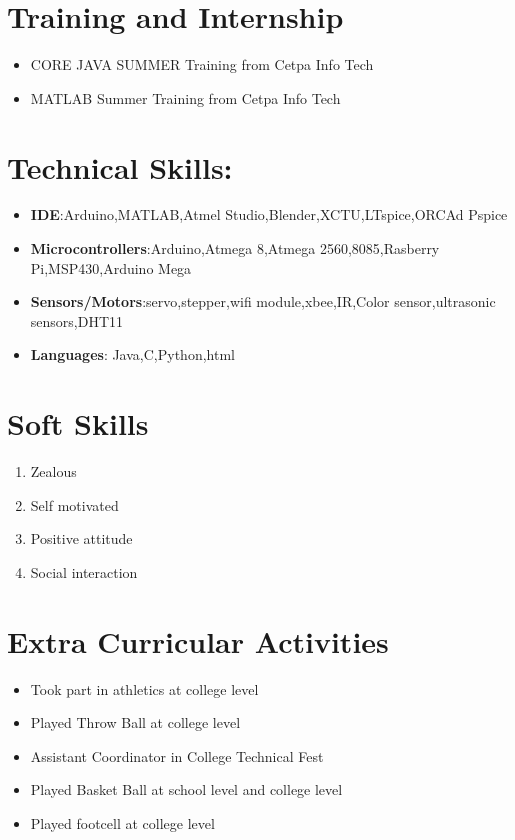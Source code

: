 \documentclass[11pt]{article}
\begin{document}
\section{Training and Internship}
\begin{itemize}
 \item CORE JAVA SUMMER Training from Cetpa Info Tech
\item MATLAB Summer Training from Cetpa Info Tech
\end{itemize}
\newpage
\section{Technical Skills:}
\begin{itemize}

\item\textbf {IDE}:Arduino,MATLAB,Atmel Studio,Blender,XCTU,LTspice,ORCAd Pspice
 \item\textbf{ Microcontrollers}:Arduino,Atmega 8,Atmega 2560,8085,Rasberry Pi,MSP430,Arduino Mega
\item\textbf{ Sensors/Motors}:servo,stepper,wifi module,xbee,IR,Color sensor,ultrasonic sensors,DHT11
\item\textbf{ Languages}: Java,C,Python,html
 \end{itemize}
\section{Soft Skills}
\begin{enumerate}
\item Zealous
\item Self motivated
\item Positive attitude
\item Social interaction
\end{enumerate}
\section{Extra Curricular Activities}
\begin{itemize}
\item Took part in athletics at college level
\item Played Throw Ball at college level
\item Assistant Coordinator in College Technical Fest
\item Played Basket Ball at school level and college level
\item Played footcell at college level \\
\end{itemize}
\end{document}
